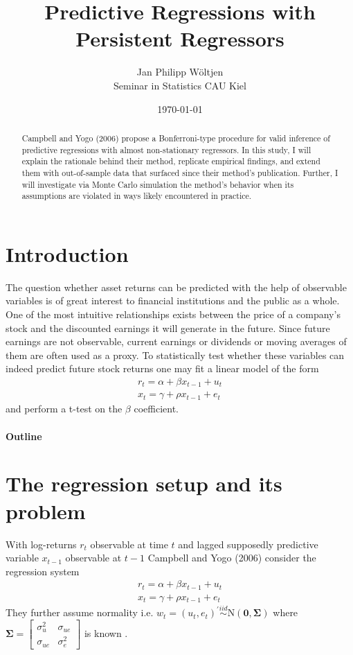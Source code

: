 \documentclass{article}
\title{Predictive Regressions with Persistent Regressors}
\author{Jan Philipp Wöltjen  \\
	Seminar in Statistics CAU Kiel  \\
	}
\date{\today}
\begin{document}
\maketitle


\begin{abstract}
Campbell and Yogo (2006) propose a Bonferroni-type procedure for valid inference of predictive regressions with almost non-stationary regressors. In this study, I will explain the rationale behind their method, replicate empirical findings, and extend them with out-of-sample data that surfaced since their method's publication. Further, I will investigate via Monte Carlo simulation the method's behavior when its assumptions are violated in ways likely encountered in practice. 
\end{abstract}

\section{Introduction}
The question whether asset returns can be predicted with the help of observable variables is of great interest to financial institutions and the public as a whole. One of the most intuitive relationships exists between the price of a company's stock and the discounted earnings it will generate in the future. Since future earnings are not observable, current earnings or dividends or moving averages of them are often used as a proxy. To statistically test whether these variables can indeed predict future stock returns one may fit a linear model of the form 
\begin{align} 
r_{t} = \alpha + \beta x_{t-1} + u_{t} \\ 
x_{t} = \gamma + \rho  x_{t-1} + e_{t}
\end{align}
and perform a t-test on the $\beta$ coefficient. 

\paragraph{Outline}

\section{The regression setup and its problem
}
With log-returns $r_{t}$ observable at time $t$ and lagged supposedly predictive variable $x_{t-1}$ observable at $t-1$  Campbell and Yogo (2006) consider the regression system
\begin{align} 
\label{eqn:1}
r_{t} = \alpha + \beta x_{t-1} + u_{t} \\ 
\label{eqn:2}
x_{t} = \gamma + \rho  x_{t-1} + e_{t}
\end{align}
They further assume normality i.e. $w_{t}=\left(u_{t}, e_{t}\right)^{\prime} \stackrel{i i d}{\sim} \mathrm{N}(\boldsymbol{0}, \boldsymbol{\Sigma})$ where  $\boldsymbol{\Sigma}=\left[\begin{array}{cc}{\sigma_{u}^{2}} & {\sigma_{u e}} \\ {\sigma_{u e}} & {\sigma_{e}^{2}}\end{array}\right]$ is known .
\end{document}
